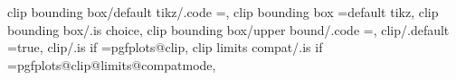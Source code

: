 clip bounding box/default tikz/.code                               =\def\pgfplots@clip@BB@mode{0},                                                                                                     
clip bounding box                                                  =default tikz, %
clip bounding box/.is choice,
clip bounding box/upper bound/.code                                =\def\pgfplots@clip@BB@mode{1},                                                                                                     
clip/.default                                                      =true,                                                                                                                              
clip/.is if                                                        =pgfplots@clip,                                                                                                                     
clip limits compat/.is if                                          =pgfplots@clip@limits@compatmode,                                                                                                   

